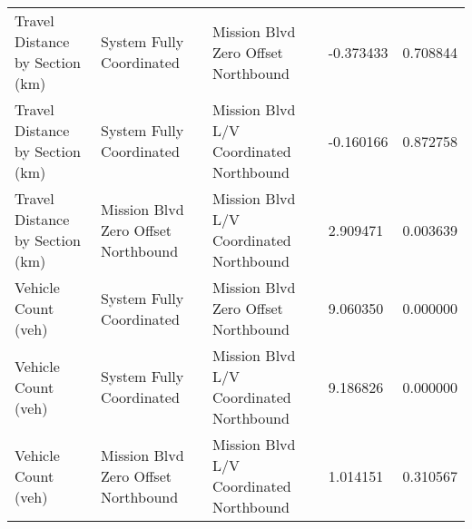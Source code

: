 \begin{tabular}{lllll}
Travel Distance by Section (km) & System Fully Coordinated & Mission Blvd Zero Offset Northbound & -0.373433 & 0.708844 \\
Travel Distance by Section (km) & System Fully Coordinated & Mission Blvd L/V Coordinated Northbound & -0.160166 & 0.872758 \\
Travel Distance by Section (km) & Mission Blvd Zero Offset Northbound & Mission Blvd L/V Coordinated Northbound & 2.909471 & 0.003639 \\
Vehicle Count (veh) & System Fully Coordinated & Mission Blvd Zero Offset Northbound & 9.060350 & 0.000000 \\
Vehicle Count (veh) & System Fully Coordinated & Mission Blvd L/V Coordinated Northbound & 9.186826 & 0.000000 \\
Vehicle Count (veh) & Mission Blvd Zero Offset Northbound & Mission Blvd L/V Coordinated Northbound & 1.014151 & 0.310567 \\
\bottomrule
\end{tabular}
